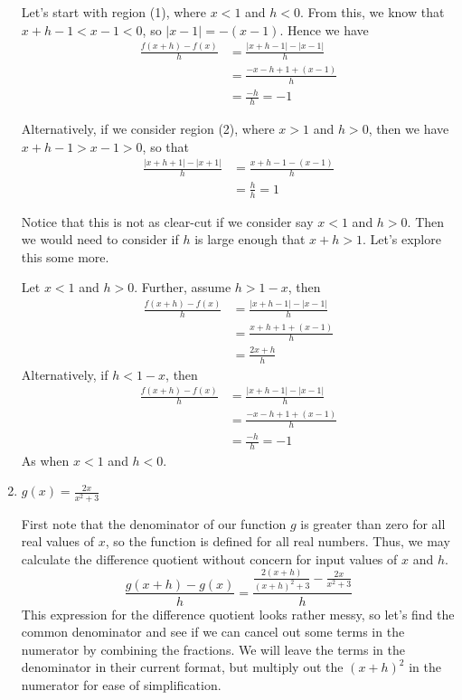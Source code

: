 \documentclass{ximera}
\begin{document}
\begin{example}
\begin{enumerate}
\begin{explanation}
  Let's start with region (1), where $x<1$ and $h<0$. From this, we know that $x+h-1<x-1<0$, so $|x-1|=-(x-1)$. Hence we have
  \begin{align*}
 \frac{f(x+h) - f(x)}{h} &= \frac{|x+h-1| - |x-1|}{h}\\
 &= \frac{-x-h+1 + (x-1)}{h}\\
 &= \frac{-h}{h} = -1
 \end{align*}
 
 Alternatively, if we consider region (2), where $x>1$ and $h>0$, then we have $x+h-1>x-1>0$, so that
  \begin{align*}
 \frac{|x+h+1| - |x+1|}{h} &= \frac{x+h-1 - (x-1)}{h}\\
 &= \frac{h}{h} = 1
 \end{align*}
 
 Notice that this is not as clear-cut if we consider say $x<1$ and $h>0$. Then we would need to consider if $h$ is large enough that $x+h>1$. Let's explore this some more.
 
 Let $x<1$ and $h>0$. Further, assume $h>1-x$, then 
  \begin{align*}
 \frac{f(x+h) - f(x)}{h} &= \frac{|x+h-1| - |x-1|}{h}\\
 &= \frac{x+h+1 + (x-1)}{h}\\
 &= \frac{2x + h}{h}
 \end{align*}
Alternatively, if $h<1-x$, then
 \begin{align*}
 \frac{f(x+h) - f(x)}{h} &= \frac{|x+h-1| - |x-1|}{h}\\
 &= \frac{-x-h+1 + (x-1)}{h}\\
 &= \frac{-h}{h} = -1
 \end{align*}
As when $x<1$ and $h<0$.
 \end{explanation}
 
 \item $g(x) =  \frac{2x}{x^2 + 3}$\\
 \begin{explanation}
 First note that the denominator of our function $g$ is greater than zero for all real values of $x$, so the function is defined for all real numbers. Thus, we may calculate the difference quotient without concern for input values of $x$ and $h$.
 \begin{equation*}
 \frac{g(x+h) - g(x)}{h} = \frac{\frac{2(x+h)}{(x+h)^2 + 3} - \frac{2x}{x^2+3}}{h}
 \end{equation*}
 This expression for the difference quotient looks rather messy, so let's find the common denominator and see if we can cancel out some terms in the numerator by combining the fractions. We will leave the terms in the denominator in their current format, but multiply out the $(x+h)^2$ in the numerator for ease of simplification. 
 

\end{explanation}
\end{enumerate}
\end{example}
\end{document}
